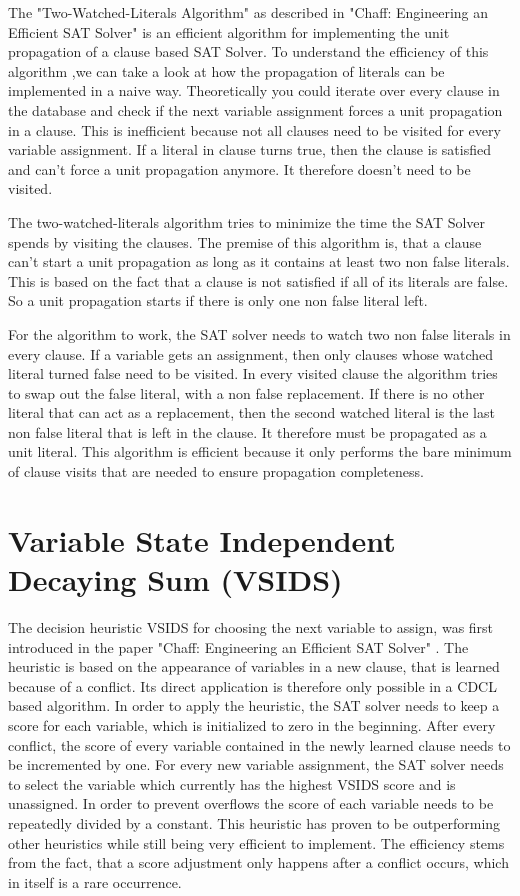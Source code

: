 The "Two-Watched-Literals Algorithm" as described in "Chaff: Engineering an Efficient SAT Solver" \cite{moskewicz2001chaff} is an efficient algorithm for implementing the unit propagation of a clause based SAT Solver. To understand the efficiency of this algorithm ,we can take a look at how the propagation of literals can be implemented in a naive way. Theoretically you could iterate over every clause in the database and check if the next variable assignment forces a unit propagation in a clause. This is inefficient because not all clauses need to be visited for every variable assignment. If a literal in clause turns true, then the clause is satisfied and can't force a unit propagation anymore. It therefore doesn't need to be visited.

The two-watched-literals algorithm tries to minimize the time the SAT Solver spends by visiting the clauses. The premise of this algorithm is, that a clause can't start a unit propagation as long as it contains at least two non false literals. This is based on the fact that a clause is not satisfied if all of its literals are false. So a unit propagation starts if there is only one non false literal left.

For the algorithm to work, the SAT solver needs to watch two non false literals in every clause. If a variable gets an assignment, then only clauses whose watched literal turned false need to be visited. In every visited clause the algorithm tries to swap out the false literal, with a non false replacement. If there is no other literal that can act as a replacement, then the second watched literal is the last non false literal that is left in the clause. It therefore must be propagated as a unit literal. This algorithm is efficient because it only performs the bare minimum of clause visits that are needed to ensure propagation completeness.

\section{Variable State Independent Decaying Sum (VSIDS)}
\label{sec:VSIDS}

The decision heuristic VSIDS for choosing the next variable to assign, was first introduced in the paper "Chaff: Engineering an Efficient SAT Solver" \cite{moskewicz2001chaff}. The heuristic is based on the appearance of variables in a new clause, that is learned because of a conflict. Its direct application is therefore only possible in a CDCL based algorithm. In order to apply the heuristic, the SAT solver needs to keep a score for each variable, which is initialized to zero in the beginning. After every conflict, the score of every variable contained in the newly learned clause needs to be incremented by one. For every new variable assignment, the SAT solver needs to select the variable which currently has the highest VSIDS score and is unassigned. In order to prevent overflows the score of each variable needs to be repeatedly divided by a constant. This heuristic has proven to be outperforming other heuristics while still being very efficient to implement. The efficiency stems from the fact, that a score adjustment only happens after a conflict occurs, which in itself is a rare occurrence.


